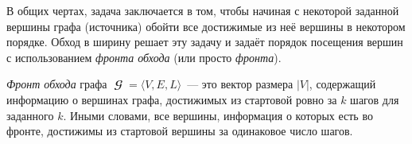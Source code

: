 В общих чертах, задача заключается в том, чтобы начиная с некоторой заданной вершины графа (источника) обойти все достижимые из неё вершины в некотором порядке.
Обход в ширину решает эту задачу и задаёт порядок посещения вершин с использованием \emph{фронта обхода} (или просто \emph{фронта}).
\begin{definition}
    \emph{Фронт обхода} графа $\mbfscrG = \langle V, E, L \rangle$~--- это вектор размера $|V|$, содержащий информацию%
     о вершинах графа, достижимых из стартовой ровно за $k$ шагов для заданного $k$.
    Иными словами, все вершины, информация о которых есть во фронте, достижимы из стартовой вершины за одинаковое число шагов.
\end{definition}

